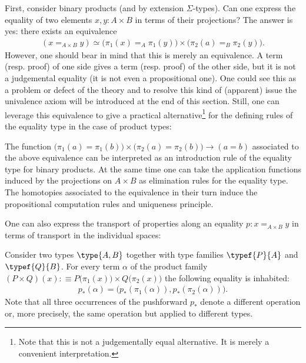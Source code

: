     First, consider binary products (and by extension $\Sigma$-types). Can one express the equality of two elements $x,y:A\times B$ in terms of their projections? The answer is yes: there exists an equivalence
    \begin{gather}
        (x=_{A\times B}y)\simeq\big(\pi_1(x)=_A\pi_1(y)\big)\times\big(\pi_2(a)=_B\pi_2(y)\big).
    \end{gather}
    However, one should bear in mind that this is merely an equivalence. A term (resp. proof) of one side gives a term (resp. proof) of the other side, but it is not a judgemental equality (it is not even a propositional one). One could see this as a problem or defect of the theory and to resolve this kind of (apparent) issue the univalence axiom will be introduced at the end of this section. Still, one can leverage this equivalence to give a practical alternative\footnote{Note that this is not a judgementally equal alternative. It is merely a convenient interpretation.} for the defining rules of the equality type in the case of product types:
    \begin{remark}
        The function $\big(\pi_1(a)=\pi_1(b)\big)\times\big(\pi_2(a)=\pi_2(b)\big)\rightarrow(a=b)$ associated to the above equivalence can be interpreted as an introduction rule of the equality type for binary products. At the same time one can take the application functions induced by the projections on $A\times B$ as elimination rules for the equality type. The homotopies associated to the equivalence in their turn induce the propositional computation rules and uniqueness principle.
    \end{remark}

    One can also express the transport of properties along an equality $p:x=_{A\times B}y$ in terms of transport in the individual spaces:
    \begin{property}
        Consider two types $\type{A, B}$ together with type families $\typef{P}{A}$ and $\typef{Q}{B}$. For every term $\alpha$ of the product family $(P\times Q)(x):\equiv P\big(\pi_1(x)\big)\times Q\big(\pi_2(x)\big)$ the following equality is inhabited:
        \begin{gather}
            p_*(\alpha) = \big(p_*(\pi_1(\alpha)), p_*(\pi_2(\alpha))\big).
        \end{gather}
        Note that all three occurrences of the pushforward $p_*$ denote a different operation or, more precisely, the same operation but applied to different types.
    \end{property}

